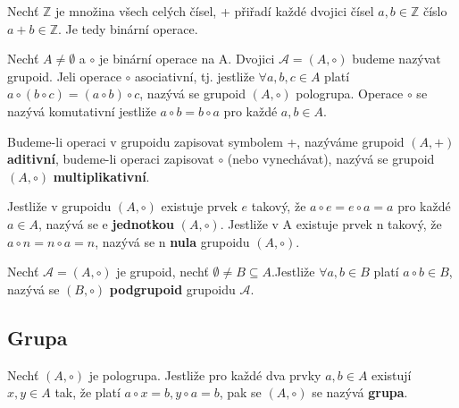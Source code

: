\begin{example}
	Nechť $\mathbb{Z}$ je množina všech celých čísel, + přiřadí každé dvojici čísel $a,b \in \mathbb{Z}$ číslo $a + b \in \mathbb{Z}$. Je tedy binární operace.
\end{example}

\begin{definition}
	Nechť $A \not= \emptyset$ a $\circ$ je binární operace na A. Dvojici $\mathscr{A} = (A, \circ)$ budeme nazývat grupoid. Jeli operace $\circ$ asociativní, tj. jestliže $\forall a,b,c \in A$ platí $a \circ (b \circ c) = (a \circ b) \circ c$, nazývá se grupoid $(A, \circ)$ pologrupa. Operace $\circ$ se nazývá komutativní jestliže $a \circ b = b \circ a$ pro každé $a,b \in A$.
\end{definition}

Budeme-li operaci v grupoidu zapisovat symbolem +, nazýváme grupoid $(A, +)$ \textbf{aditivní}, budeme-li operaci zapisovat $\circ$ (nebo vynechávat), nazývá se grupoid $(A, \circ)$ \textbf{multiplikativní}.

\begin{definition}
	Jestliže v grupoidu $(A, \circ)$ existuje prvek $e$ takový, že $a \circ e = e \circ a = a$ pro každé $a \in A$, nazývá se e \textbf{jednotkou} $(A, \circ)$. Jestliže v A existuje prvek n takový, že $a \circ n = n \circ a = n$, nazývá se n \textbf{nula} grupoidu $(A, \circ)$.
\end{definition}

\begin{definition}
	Nechť $\mathscr{A} = (A, \circ)$ je grupoid, nechť $\emptyset \not= B \subseteq A$.Jestliže $\forall a,b \in B$ platí $a \circ b \in B$, nazývá se $(B, \circ)$ \textbf{podgrupoid} grupoidu $\mathscr{A}$.
\end{definition}

\subsection{Grupa}
\begin{definition}
	Nechť $(A, \circ)$ je pologrupa. Jestliže pro každé dva prvky $a,b \in A$ existují $x,y \in A$ tak, že platí  $a \circ x = b, y \circ a = b$, pak se $(A, \circ)$ se nazývá \textbf{grupa}.
\end{definition}

